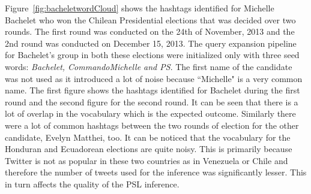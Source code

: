 Figure~\ref{fig:bacheletwordCloud} shows the hashtags identified for Michelle Bachelet who won the Chilean Presidential elections that was decided over two rounds.
The first round was conducted on the 24th of November, 2013 and the 2nd round was conducted on December 15, 2013. 
The query expansion pipeline for Bachelet's group in both these elections were initialized only with three seed words: {\it Bachelet, CommandoMichelle and PS}. 
The first name of the candidate was not used as it introduced a lot of noise because ``Michelle" is a very common name.
The first figure shows the hashtags identified for Bachelet during the first round and the second figure for the second round. 
It can be seen that there is a lot of overlap in the vocabulary which is the expected outcome. 
Similarly there were a lot of common hashtags between the two rounds of election for the other candidate, Evelyn Matthei, too.
It can be noticed that the vocabulary for the Honduran and Ecuadorean  elections are quite noisy. 
This is primarily because Twitter is not as popular in these two countries as in Venezuela or Chile and therefore the number of tweets
used for the inference was significantly lesser.
This in turn affects the quality of the PSL inference.



